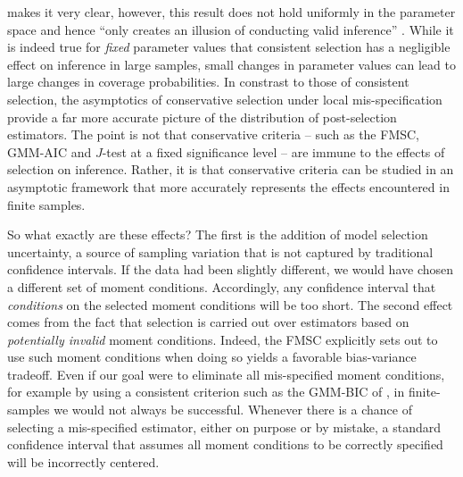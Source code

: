\citet[pp.\ 179--180]{Poetscher1991} makes it very clear, however, this result does not hold uniformly in the parameter space and hence ``only creates an illusion of conducting valid inference'' \citep[p.\ 22]{LeebPoetscher2005}.
While it is indeed true for \emph{fixed} parameter values that consistent selection has a negligible effect on inference in large samples, small changes in parameter values can lead to large changes in coverage probabilities. 
In constrast to those of consistent selection, the asymptotics of conservative selection under local mis-specification provide a far more accurate picture of the distribution of post-selection estimators.
The point is not that conservative criteria -- such as the FMSC, GMM-AIC and $J$-test at a fixed significance level -- are immune to the effects of selection on inference.
Rather, it is that conservative criteria can be studied in an asymptotic framework that more accurately represents the effects encountered in finite samples.

So what exactly are these effects?
The first is the addition of model selection uncertainty, a source of sampling variation that is not captured by traditional confidence intervals.
If the data had been slightly different, we would have chosen a different set of moment conditions.
Accordingly, any confidence interval that \emph{conditions} on the selected moment conditions will be too short.
The second effect comes from the fact that selection is carried out over estimators based on \emph{potentially invalid} moment conditions.
Indeed, the FMSC explicitly sets out to use such moment conditions when doing so yields a favorable bias-variance tradeoff.
Even if our goal were to eliminate all mis-specified moment conditions, for example by using a consistent criterion such as the GMM-BIC of \cite{Andrews1999}, in finite-samples we would not always be successful.
Whenever there is a chance of selecting a mis-specified estimator, either on purpose or by mistake, a standard confidence interval that assumes all moment conditions to be correctly specified will be incorrectly centered.

